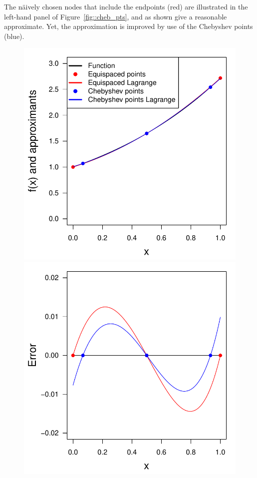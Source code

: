 \documentclass[11pt]{article}
\begin{document}
The n\"aively chosen nodes that include the endpoints (red) are illustrated in the left-hand panel of Figure~\ref{fig::cheb_pts}, and as shown give a reasonable approximate. Yet, the approximation is improved by use of the Chebyshev points (blue). 
%
\begin{figure}[ht!]\centering
\begin{minipage}{0.48\textwidth}
\includegraphics[width=\textwidth]{3_approximation/cheb_pts_lagr.pdf}

\end{minipage}
\begin{minipage}{0.48\textwidth}

\includegraphics[width=\textwidth]{3_approximation/cheb_pts_lagr_err.pdf}


\end{minipage}
\end{figure}
\end{document}
